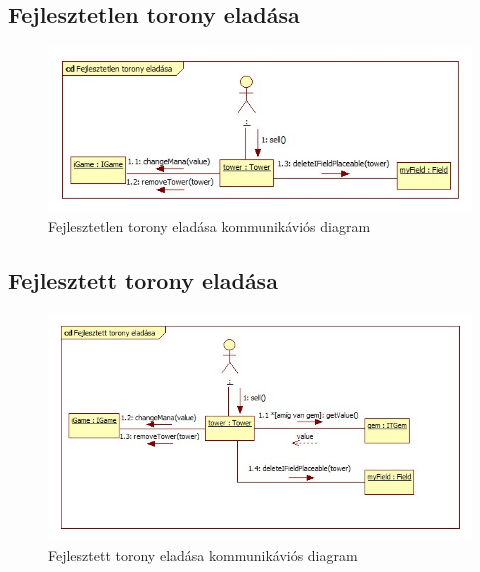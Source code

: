 \subsection{Fejlesztetlen torony eladása}
\begin{figure}[H]
\begin{center}
\includegraphics[width=17cm]{chapters/chapter05/images/cd_Fejlesztetlen_torony_eladasa.jpg}
\caption{Fejlesztetlen torony eladása kommunikáviós diagram}
\label{fig:cd_Fejlesztetlen_torony_eladasa}
\end{center}
\end{figure}

\subsection{Fejlesztett torony eladása}
\begin{figure}[H]
\begin{center}
\includegraphics[width=17cm]{chapters/chapter05/images/cd_Fejlesztett_torony_eladasa.jpg}
\caption{Fejlesztett torony eladása kommunikáviós diagram}
\label{fig:cd_Fejlesztett_torony_eladasa}
\end{center}
\end{figure}

